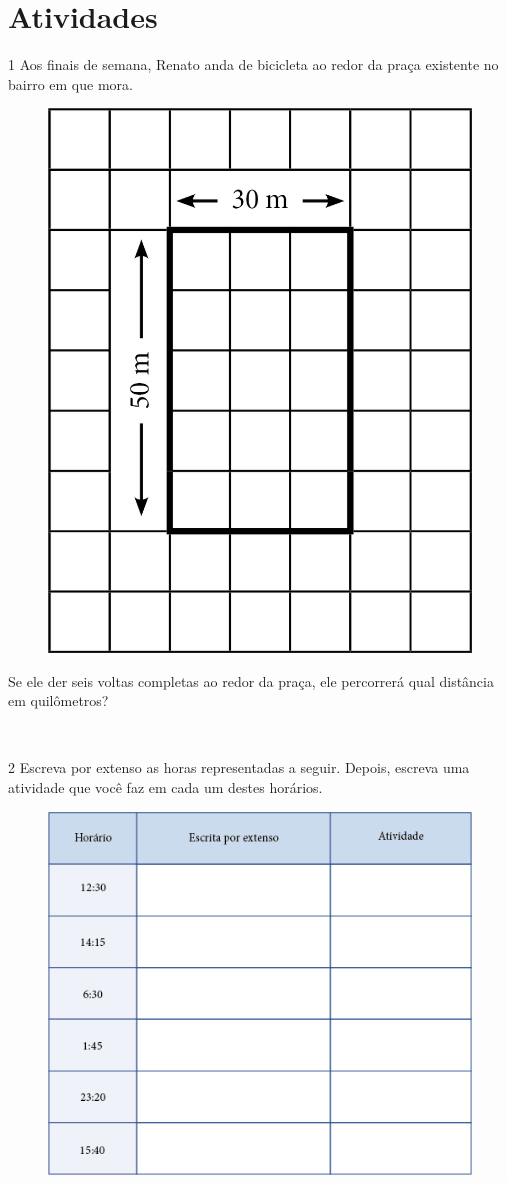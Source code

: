 \section{Atividades}

\num{1} Aos finais de semana, Renato anda de bicicleta ao redor da praça
existente no bairro em que mora.
\pagebreak

\begin{figure}[htpb!]
\centering
\includegraphics[width=.3\textwidth]{media/image27.png}
\end{figure}

Se ele der seis voltas completas ao redor da praça, ele percorrerá qual
distância em quilômetros?

\begin{mdframed}[linewidth=2pt,linecolor=salmao,roundcorner=2pt]
\\
\end{mdframed}


\num{2} Escreva por extenso as horas representadas a seguir. Depois, escreva uma atividade que você faz em cada um destes horários.

\begin{figure}[htpb!]
\centering
\includegraphics[width=.65\textwidth]{media/image28.png}
\end{figure}

